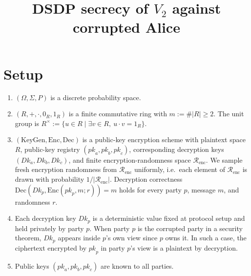 \documentclass[11pt]{article}
\title{DSDP secrecy of $V_2$ against corrupted Alice}
\author{}
\date{}
\newcommand{\Renc}{\mathcal{R}_{\mathrm{enc}}}
\newcommand{\Encf}{\mathrm{Enc}}
\newcommand{\Decf}{\mathrm{Dec}}
\newcommand{\KeyGen}{\mathrm{KeyGen}}
\newcommand{\Dk}{\mathit{Dk}}
\newcommand{\pk}{\mathit{pk}}
\begin{document}
\maketitle

\section*{Setup}

\begin{enumerate}
\item $(\Omega, \Sigma, P)$ is a discrete probability space.

\item $(R, +, \cdot, 0_R, 1_R)$ is a finite commutative ring with $m := \#|R| \geq 2$. The unit group is $R^\times := \{ u \in R \mid \exists v \in R,\ u \cdot v = 1_R \}$.

\item $(\KeyGen, \Encf, \Decf)$ is a public-key encryption scheme with plaintext space $R$, public-key registry $(\pk_a, \pk_b, \pk_c)$, corresponding decryption keys $(\Dk_a, \Dk_b, \Dk_c)$, and finite encryption-randomness space $\Renc$. We sample fresh encryption randomness from $\Renc$ uniformly, i.e.\ each element of $\Renc$ is drawn with probability $1 / |\Renc|$. Decryption correctness $\Decf(\Dk_p, \Encf(\pk_p, m; r)) = m$ holds for every party $p$, message $m$, and randomness $r$.

\item Each decryption key $\Dk_p$ is a deterministic value fixed at protocol setup and held privately by party $p$. When party $p$ is the corrupted party in a security theorem, $\Dk_p$ appears inside $p$'s own view since $p$ owns it. In such a case, the ciphertext encrypted by $\pk_p$ in party $p$'s view is a plaintext by decryption.

\item Public keys $(\pk_a, \pk_b, \pk_c)$ are known to all parties.


\end{enumerate}
\end{document}

